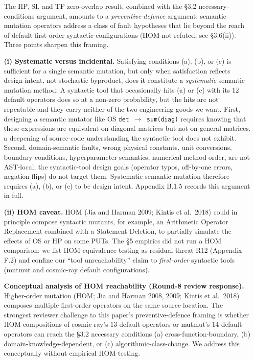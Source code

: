 \documentclass[review,12pt,authoryear]{elsarticle}
\begin{document}
The HP, SI, and TF zero-overlap result, combined with the §3.2
necessary-conditions argument, amounts to a \emph{preventive-defence}
argument: semantic mutation operators address a class of fault
hypotheses that lie beyond the reach of default first-order syntactic
configurations (HOM not refuted; see §3.6(ii)). Three points sharpen
this framing.

\textbf{(i) Systematic versus incidental.} Satisfying conditions (a),
(b), or (c) is sufficient for a single semantic mutation, but only when
satisfaction reflects design intent, not stochastic byproduct, does it
constitute a \emph{systematic} semantic mutation method. A syntactic
tool that occasionally hits (a) or (c) with its 12 default operators
does so at a non-zero probability, but the hits are not repeatable and
they carry neither of the two engineering goods we want. First,
designing a semantic mutator like OS \texttt{det\ $\to$\ sum(diag)} requires
knowing that these expressions are equivalent on diagonal matrices but
not on general matrices, a deepening of source-code understanding the
syntactic tool does not exhibit. Second, domain-semantic faults, wrong
physical constants, unit conversions, boundary conditions,
hyperparameter semantics, numerical-method order, are not AST-local; the
syntactic-tool design goals (operator typos, off-by-one errors, negation
flips) do not target them. Systematic semantic mutation therefore
requires (a), (b), or (c) to be design intent. Appendix B.1.5 records
this argument in full.

\textbf{(ii) HOM caveat.} HOM (Jia and Harman 2009; Kintis et al.~2018)
could in principle compose syntactic mutants, for example, an Arithmetic
Operator Replacement combined with a Statement Deletion, to partially
simulate the effects of OS or HP on some PUTs. The §5 empirics did not
run a HOM comparison; we list HOM equivalence testing as residual threat
R12 (Appendix F.2) and confine our ``tool unreachability'' claim to
\emph{first-order} syntactic tools (mutmut and cosmic-ray default
configurations).

\textbf{Conceptual analysis of HOM reachability (Round-8 review
response).} Higher-order mutation (HOM; Jia and Harman 2008, 2009;
Kintis et al.~2018) composes multiple first-order operators on the same
source location. The strongest reviewer challenge to this paper's
preventive-defence framing is whether HOM compositions of cosmic-ray's
13 default operators or mutmut's 14 default operators can reach the §3.2
necessary conditions (a) cross-function-boundary, (b)
domain-knowledge-dependent, or (c) algorithmic-class-change. We address
this conceptually without empirical HOM testing.
\end{document}
